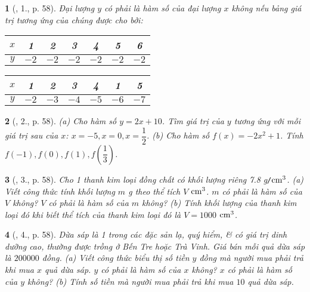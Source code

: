 \documentclass{article}
\newtheorem{baitoan}{}
\begin{document}
\begin{baitoan}[\cite{SGK_Toan_8_Canh_Dieu_tap_1}, 1., p. 58]
	Đại lượng $y$ có phải là hàm số của đại lượng $x$ không nếu bảng giá trị tương ứng của chúng được cho bởi:
	\begin{table}[H]
		\centering
		\begin{tabular}{|c|c|c|c|c|c|c|}
			\hline
			$x$ & 1 & 2 & 3 & 4 & 5 & 6 \\
			\hline
			$y$ & $-2$ & $-2$ & $-2$ & $-2$ & $-2$ & $-2$ \\
			\hline
		\end{tabular}
	\end{table}
	\begin{table}[H]
		\centering
		\begin{tabular}{|c|c|c|c|c|c|c|}
			\hline
			$x$ & 1 & 2 & 3 & 4 & 1 & 5 \\
			\hline
			$y$ & $-2$ & $-3$ & $-4$ & $-5$ & $-6$ & $-7$ \\
			\hline
		\end{tabular}
	\end{table}
\end{baitoan}

\begin{baitoan}[\cite{SGK_Toan_8_Canh_Dieu_tap_1}, 2., p. 58]
	(a) Cho hàm số $y = 2x + 10$. Tìm giá trị của $y$ tương ứng với mỗi giá trị sau của $x$: $x = -5,x = 0,x = \dfrac{1}{2}$. (b) Cho hàm số $f(x) = -2x^2 + 1$. Tính $f(-1),f(0),f(1),f\left(\dfrac{1}{3}\right)$.
\end{baitoan}

\begin{baitoan}[\cite{SGK_Toan_8_Canh_Dieu_tap_1}, 3., p. 58]
	Cho 1 thanh kim loại đồng chất có khối lượng riêng {\rm7.8 g{\tt/}$\rm cm^3$}. (a) Viết công thức tính khối lượng $m$ {\rm g} theo thể tích $V$ $\rm cm^3$. $m$ có phải là hàm số của $V$ không? $V$ có phải là hàm số của $m$ không? (b) Tính khối lượng của thanh kim loại đó khi biết thể tích của thanh kim loại đó là $V = 1000$ $\rm cm^3$.
\end{baitoan}

\begin{baitoan}[\cite{SGK_Toan_8_Canh_Dieu_tap_1}, 4., p. 58]
	Dừa sáp là 1 trong các đặc sản lạ, quý hiểm, \& có giá trị dinh dưỡng cao, thường được trồng ở Bến Tre hoặc Trà Vinh. Giá bán mỗi quả dừa sáp là $200000$ đồng. (a) Viết công thức biểu thị số tiền $y$ đồng mà người mua phải trả khi mua $x$ quả dừa sáp. $y$ có phải là hàm số của $x$ không? $x$ có phải là hàm số của $y$ không? (b) Tính số tiền mà người mua phải trả khi mua $10$ quả dừa sáp.
\end{baitoan}
\end{document}
